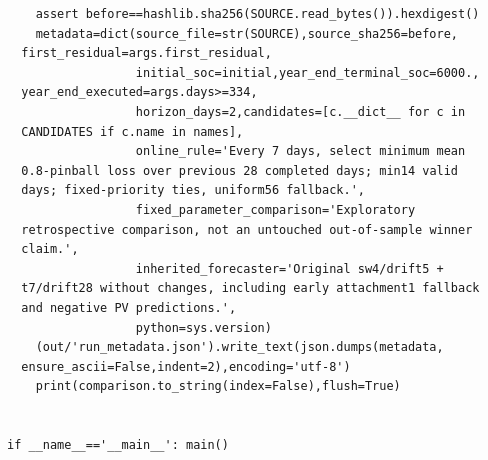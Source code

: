 \begin{verbatim}
    assert before==hashlib.sha256(SOURCE.read_bytes()).hexdigest()
    metadata=dict(source_file=str(SOURCE),source_sha256=before,
  first_residual=args.first_residual,
                  initial_soc=initial,year_end_terminal_soc=6000.,
  year_end_executed=args.days>=334,
                  horizon_days=2,candidates=[c.__dict__ for c in
  CANDIDATES if c.name in names],
                  online_rule='Every 7 days, select minimum mean
  0.8-pinball loss over previous 28 completed days; min14 valid
  days; fixed-priority ties, uniform56 fallback.',
                  fixed_parameter_comparison='Exploratory
  retrospective comparison, not an untouched out-of-sample winner
  claim.',
                  inherited_forecaster='Original sw4/drift5 +
  t7/drift28 without changes, including early attachment1 fallback
  and negative PV predictions.',
                  python=sys.version)
    (out/'run_metadata.json').write_text(json.dumps(metadata,
  ensure_ascii=False,indent=2),encoding='utf-8')
    print(comparison.to_string(index=False),flush=True)


if __name__=='__main__': main()
\end{verbatim}

